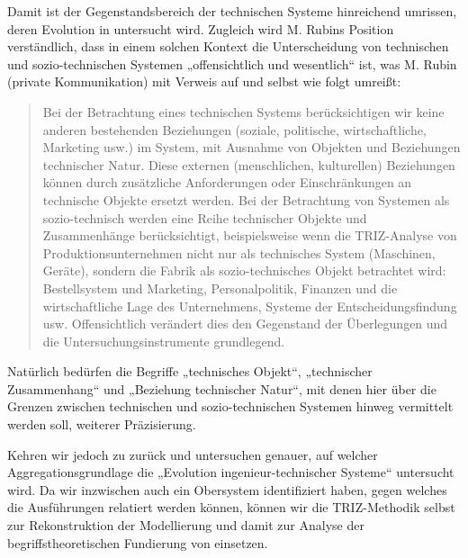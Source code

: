 \documentclass[12pt,a4paper]{article}
\begin{document}
Damit ist der Gegenstandsbereich der technischen Systeme hinreichend umrissen,
deren Evolution in \cite{TESE2018} untersucht wird. Zugleich wird M. Rubins
Position verständlich, dass in einem solchen Kontext die Unterscheidung von
technischen und sozio-technischen Systemen „offensichtlich und wesentlich“
ist, was M. Rubin (private Kommunikation) mit Verweis auf \cite{Rubin2007} und
\cite{Rubin2010} selbst wie folgt umreißt:
\begin{quote}
  Bei der Betrachtung eines technischen Systems berücksichtigen wir keine
  anderen bestehenden Beziehungen (soziale, politische, wirtschaftliche,
  Marketing usw.) im System, mit Ausnahme von Objekten und Beziehungen
  technischer Natur. Diese externen (menschlichen, kulturellen) Beziehungen
  können durch zusätzliche Anforderungen oder Einschränkungen an technische
  Objekte ersetzt werden.  Bei der Betrachtung von Systemen als
  sozio-technisch werden eine Reihe technischer Objekte und Zusammenhänge
  berücksichtigt, beispielsweise wenn die TRIZ-Analyse von
  Produktionsunternehmen nicht nur als technisches System (Maschinen, Geräte),
  sondern die Fabrik als sozio-technisches Objekt betrachtet wird:
  Bestellsystem und Marketing, Personalpolitik, Finanzen und die
  wirtschaftliche Lage des Unternehmens, Systeme der Entscheidungsfindung usw.
  Offensichtlich verändert dies den Gegenstand der Überlegungen und die
  Untersuchungsinstrumente grundlegend.
\end{quote}
Natürlich bedürfen die Begriffe „technisches Objekt“, „technischer
Zusammenhang“ und „Beziehung technischer Natur“, mit denen hier über die
Grenzen zwischen technischen und sozio-technischen Systemen hinweg vermittelt
werden soll, weiterer Präzisierung.

Kehren wir jedoch zu \cite{TESE2018} zurück und untersuchen genauer, auf
welcher Aggregationsgrundlage die „Evolution ingenieur-technischer Systeme“
untersucht wird.  Da wir inzwischen auch ein Obersystem identifiziert haben,
gegen welches die Ausführungen relatiert werden können, können wir die
TRIZ-Methodik selbst zur Rekonstruktion der Modellierung und damit zur Analyse
der begriffstheoretischen Fundierung von \cite{TESE2018} einsetzen.
\end{document}
